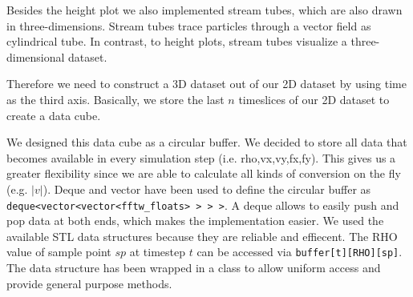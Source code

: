 Besides the height plot we also implemented stream tubes, which are also drawn in three-dimensions. Stream tubes trace particles through a vector field as cylindrical tube. In contrast, to  height plots, stream tubes visualize a three-dimensional dataset. 

Therefore we need to construct a 3D dataset out of our 2D dataset by using time as the third axis. Basically, we store the last $n$ timeslices of our 2D dataset to create a data cube. 

We designed this data cube as a circular buffer. We decided to store all data that becomes available in every simulation step (i.e. rho,vx,vy,fx,fy). This gives us a greater flexibility since we are able to calculate all kinds of conversion on the fly (e.g. $|v|$).  
Deque and vector have been used to define the circular buffer as \verb| deque<vector<vector<fftw_floats> > > >|.  A deque  allows to easily push and pop data at both ends, which makes the implementation easier. 
We used the available STL data structures because they are reliable and effiecent.
The RHO value of sample point $sp$  at timestep $t$ can be accessed via  \verb|buffer[t][RHO][sp]|. The data structure has been wrapped in a class to allow uniform access and provide general purpose methods. 

